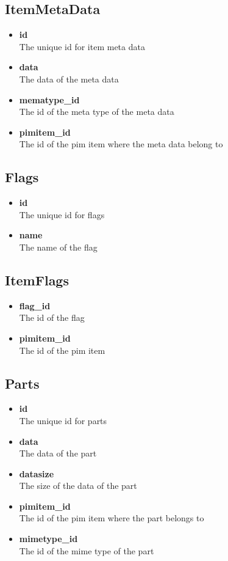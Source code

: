 \documentclass[]{report}
\begin{document}
\subsection{ItemMetaData}
\begin{itemize}
  \item \textbf{id}\\
    The unique id for item meta data
  \item \textbf{data}\\
    The data of the meta data
  \item \textbf{mematype\_id}\\
    The id of the meta type of the meta data
  \item \textbf{pimitem\_id}\\
    The id of the pim item where the meta data belong to
\end{itemize}

\subsection{Flags}
\begin{itemize}
  \item \textbf{id}\\
    The unique id for flags
  \item \textbf{name}\\
    The name of the flag
\end{itemize}

\subsection{ItemFlags}
\begin{itemize}
  \item \textbf{flag\_id}\\
    The id of the flag
  \item \textbf{pimitem\_id}\\
    The id of the pim item
\end{itemize}

\subsection{Parts}
\begin{itemize}
  \item \textbf{id}\\
    The unique id for parts
  \item \textbf{data}\\
    The data of the part
  \item \textbf{datasize}\\
    The size of the data of the part
  \item \textbf{pimitem\_id}\\
    The id of the pim item where the part belongs to
  \item \textbf{mimetype\_id}\\
    The id of the mime type of the part
\end{itemize}
\end{document}
